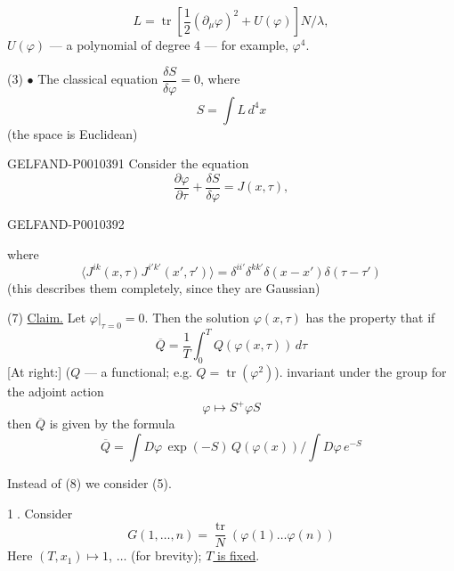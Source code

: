 \begin{equation*}
L=\operatorname{tr}\left[\frac12(\partial_\mu\varphi)^2+U(\varphi)\right]N/\lambda,
\tag{2}
\end{equation*}
$U(\varphi)$ --- a polynomial of degree 4 --- for example, $\varphi^4$.

(3) $\bullet$ The classical equation $\dfrac{\delta S}{\delta\varphi}=0$, where
\begin{equation*}
S=\int L\,d^4x
\tag{4}
\end{equation*}
(the space is Euclidean)


\begin{GelfandAdjacentEvidence}{GELFAND-P001039}{1}
Consider the equation
\begin{equation*}
\frac{\partial\varphi}{\partial\tau}+\frac{\delta S}{\delta\varphi}=J(x,\tau),
\tag{5}
\end{equation*}
\end{GelfandAdjacentEvidence}
\begin{GelfandAdjacentEvidence}{GELFAND-P001039}{2}


where
\begin{equation*}
\langle J^{ik}(x,\tau)J^{i'k'}(x',\tau')\rangle
=\delta^{ii'}\delta^{kk'}\delta(x-x')\delta(\tau-\tau')
\tag{6}
\end{equation*}
(this describes them completely, since they are Gaussian)

(7) \underline{Claim.} Let $\varphi|_{\tau=0}=0$.
Then the solution $\varphi(x,\tau)$ has the property that if
\[
\overline Q=\frac1T\int_0^T Q(\varphi(x,\tau))\,d\tau
\]
[At right:] ($Q$ --- a functional; e.g. $Q=\operatorname{tr}(\varphi^2)$).
invariant under the group for the adjoint action
\[
\varphi\longmapsto S^{+}\varphi S
\]
then $\overline Q$ is given by the formula
\begin{equation*}
\overline Q=\int D\varphi\,\exp(-S)\,Q(\varphi(x))\Big/\int D\varphi\,e^{-S}
\tag{8}
\end{equation*}

Instead of (8) we consider (5).

\textcircled{1}\quad {}. Consider
\begin{equation*}
G(1,\ldots,n)=\frac{\operatorname{tr}}N(\varphi(1)\ldots\varphi(n))
\tag{9}
\end{equation*}
Here $(T,x_1)\mapsto1$, $\ldots$ (for brevity);
\underline{$T$ is fixed}.
\end{GelfandAdjacentEvidence}
